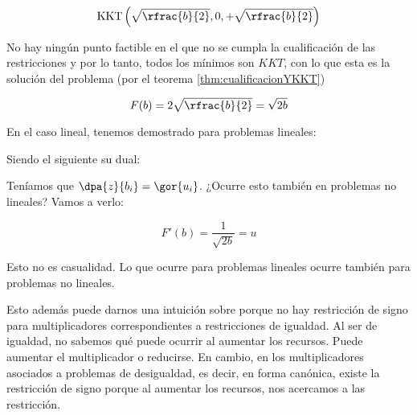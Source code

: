 \begin{problem}[1]
\[
	\KKT{\sqrt{\rfrac{b}{2}},0,+\sqrt{\rfrac{b}{2}}}
\]

\obs No hay ningún punto factible en el que no se cumpla la cualificación de las restricciones y por lo tanto, todos los mínimos son $KKT$, con lo que esta es la solución del problema (por el teorema \ref{thm:cualificacionYKKT})

\spart 

\[
	F(b) = 2\sqrt{\rfrac{b}{2}} = \sqrt{2b}
\]

En el caso lineal, tenemos demostrado para problemas lineales:

\begin{ioprob}
\end{ioprob}

Siendo el siguiente su dual:

\begin{ioprob}
\end{ioprob}

Teníamos que $\dpa{z}{b_i} = \gor{u_i}$. ¿Ocurre esto también en problemas no lineales? Vamos a verlo:

\[
	F'(b) = \frac{1}{\sqrt{2b}} = u
\]

\obs Esto no es casualidad.
%
Lo que ocurre para problemas lineales ocurre también para problemas no lineales. 

Esto además puede darnos una intuición sobre porque no hay restricción de signo para multiplicadores correspondientes a restricciones de igualdad. 
Al ser de igualdad, no sabemos qué puede ocurrir al aumentar los recursos.
%
Puede aumentar el multiplicador o reducirse.
En cambio, en los multiplicadores asociados a problemas de desigualdad, es decir, en forma canónica, existe la restricción de signo porque al aumentar los recursos, nos acercamos a las restricción. 


\end{problem}




